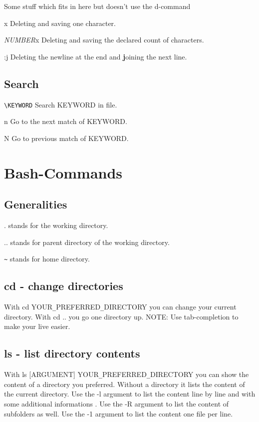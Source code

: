 \documentclass[10pt,a4paper]{scrartcl}
\begin{document}
\noindent Some stuff which fits in here but doesn't use the d-command
\begin{description}
\item{x} Deleting and saving one character.
\item{{\sl NUMBER}x} Deleting and saving the declared count of characters.
\item{:j} Deleting the newline at the end and \textbf{j}oining the next line.
\end{description}

\subsection{Search}
\begin{description}
\item{\verb$\KEYWORD$} Search KEYWORD in file.
\item{n} Go to the next match of KEYWORD.
\item{N} Go to previous match of KEYWORD.
\end{description}
\section{Bash-Commands}

\subsection{Generalities}
\begin {description}
\item{.} stands for the working directory.
\item{..} stands for parent directory of the working directory.
\item{\verb$~$} stands for home directory.
\end {description}
\subsection{cd - change directories}

With cd YOUR\verb$_$PREFERRED\verb$_$DIRECTORY you can change your current directory. With cd .. you go one directory up. NOTE: Use tab-completion to make your live easier.

\subsection{ls - list directory contents}

With ls [ARGUMENT] YOUR\verb$_$PREFERRED\verb$_$DIRECTORY you can show the content of a directory you preferred. Without a directory it lists the content of the current directory. Use the -l argument to list the content line by line and with some additional informations . Use the -R argument to list the content of subfolders as well. Use the -1 argument to list the content one file per line. 
\end{document}

